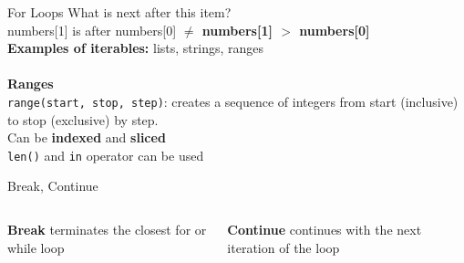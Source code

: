         \begin{frame}{For Loops}
            \LARGE
            What is next after this item?\\
            numbers[1] is after numbers[0] \textbf{$\neq$ numbers[1] $>$ numbers[0]}\\
            \textbf{Examples of iterables:} lists, strings, ranges\\
            \huge
            \\
            \textbf{Ranges}\\
            \LARGE
            \texttt{range(start, stop, step)}: creates a sequence of integers from start (inclusive) to stop (exclusive) by step.\\
            Can be \textbf{indexed} and \textbf{sliced}\\
            \texttt{len()} and \texttt{in} operator can be used
        \end{frame}


        \begin{frame}{Break, Continue}
            \begin{columns}
                \begin{column}{0.5\textwidth}
                    \textbf{Break}
                    terminates the closest for or while loop
                    \bigskip  
                    \inputminted[frame=single,framesep=2pt]{python3}{../Lecture3/code-examples/break1.py}
                    \inputminted[frame=single,framesep=2pt]{python3}{../Lecture3/code-examples/break2.py}
                \end{column}
                \begin{column}{0.5\textwidth}
                    \textbf{Continue}
                    continues with the next iteration of the loop
                    \bigskip  
                    \inputminted[frame=single,framesep=2pt]{python3}{../Lecture3/code-examples/continue1.py}
                    \inputminted[frame=single,framesep=2pt]{python3}{../Lecture3/code-examples/continue2.py}
                \end{column} 
            \end{columns}
        \end{frame}
        

